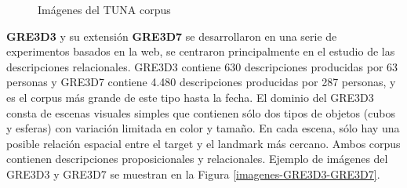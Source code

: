 \begin{figure}[!ht]
\begin{subfigure}{.5\textwidth}
\caption{}
\label{fig-TUNA-people}
\end{subfigure}
\caption{Im\'agenes del TUNA corpus}\label{imagenes-tuna}
\end{figure}


\label{sec:corpusGRE}
{\bf GRE3D3} y su extensi\'on {\bf GRE3D7} \cite{gre3d3,gre3d7} se desarrollaron en una serie de experimentos basados en la web, se centraron principalmente en el estudio de las descripciones relacionales. GRE3D3 contiene 630 descripciones producidas por 63 personas y GRE3D7 contiene 4.480 descripciones producidas por 287 personas, y es el corpus m\'as grande de este tipo hasta la fecha. El dominio del GRE3D3 consta de escenas visuales simples que contienen s\'olo dos tipos de objetos (cubos y esferas) con variaci\'on limitada en color y tama\~no. En cada escena, s\'olo hay una posible relaci\'on espacial entre el target y el landmark m\'as cercano. Ambos corpus contienen descripciones proposicionales y relacionales. Ejemplo de im\'agenes del GRE3D3 y GRE3D7 se muestran en la Figura \ref{imagenes-GRE3D3-GRE3D7}.

